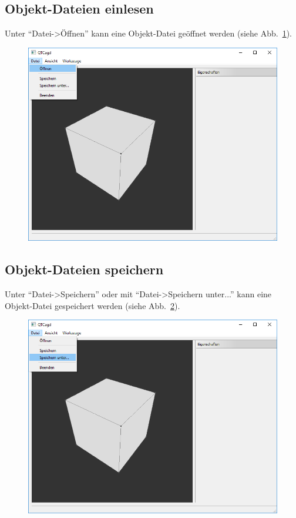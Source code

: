 \subsection{Objekt-Dateien einlesen}
Unter "`Datei->Öffnen"' kann eine Objekt-Datei geöffnet werden (siehe Abb.~\ref{fig:DateiOeffnen}).
\begin{figure}[ht!]
\centering
\includegraphics[scale=0.6]{content/pictures/0-DateiOeffnen}
\caption{}
\label{fig:DateiOeffnen}
\end{figure}
\subsection{Objekt-Dateien speichern}
Unter "`Datei->Speichern"' oder mit "`Datei->Speichern unter..."' kann eine Objekt-Datei gespeichert werden (siehe Abb.~\ref{fig:DateiSpeichern}).
\begin{figure}[ht!]
	\centering
	\includegraphics[scale=0.6]{content/pictures/1-DateiSpeichern}
	\caption{}
	\label{fig:DateiSpeichern}
\end{figure}

